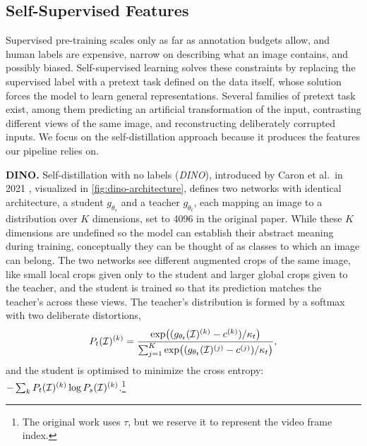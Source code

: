 \subsection{Self-Supervised Features}
\label{subsec:dino}

Supervised pre-training scales only as far as annotation budgets allow, and human
labels are expensive, narrow on describing what an image contains, and possibly biased. Self-supervised
learning solves these constraints by replacing the supervised label with a pretext task
defined on the data itself, whose solution forces the model to learn general representations. Several families of pretext task exist, among them predicting an artificial
transformation of the input, contrasting different views of the same image, and
reconstructing deliberately corrupted inputs. We focus on the self-distillation
approach because it produces the features our pipeline relies on.

\vspace{1mm}
\noindent\textbf{DINO.} \hspace{1mm} Self-distillation with no labels (\textit{DINO}), introduced by Caron et al.\ in 2021 \cite{dinov1}, visualized in \cref{fig:dino-architecture}, defines two networks with identical architecture, a student $g_{\theta_s}$ and a teacher $g_{\theta_t}$, each mapping an image to a distribution over $K$ dimensions, set to 4096 in the original paper. While these $K$ dimensions are undefined so the model can establish their abstract meaning during training, conceptually they can be thought of as classes to which an image can belong. The two networks see different augmented crops of the same image, like small local crops given only to the student and larger global crops given to the teacher, and the student is trained so that its prediction matches the teacher's across these views. The teacher's distribution is formed by a softmax with two deliberate distortions,
\begin{equation}
  P_t(\mathcal{I})^{(k)}
  = \frac{\exp\!\big((g_{\theta_t}(\mathcal{I})^{(k)}-c^{(k)})/\kappa_t\big)}
         {\sum_{j=1}^{K}\exp\!\big((g_{\theta_t}(\mathcal{I})^{(j)}-c^{(j)})/\kappa_t\big)},
  \label{eq:dino-teacher}
\end{equation}
and the student is optimised to minimize the cross entropy: $-\sum_k P_t(\mathcal{I})^{(k)}\log P_s(\mathcal{I})^{(k)}$.\footnote{The original work uses $\tau$, but we reserve it to represent the video frame index.} 


